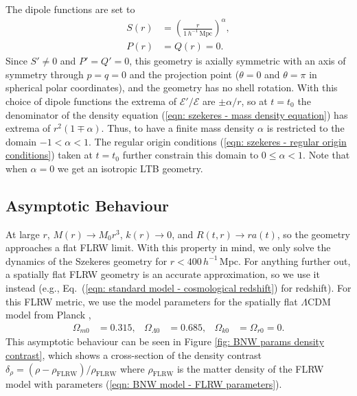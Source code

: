 \documentclass[a4paper,12pt]{report}
\renewcommand{\eqref}[1]{Eq.~({#1})}
\begin{document}
The dipole functions are set to
\begin{align}
  S(r) &= \left(\frac{r}{1\, h^{-1}\, \text{Mpc}}\right)^\alpha, \\
  P(r) &= Q(r) = 0.
\end{align}
Since $S' \neq 0$ and $P'=Q'=0$, this geometry is axially symmetric with an axis of symmetry through $p=q=0$ and the projection point ($\theta=0$ and $\theta=\pi$ in spherical polar coordinates), and the geometry has no shell rotation. With this choice of dipole functions the extrema of $\mathcal{E}'/\mathcal{E}$ are $\pm\alpha/r$, so at $t=t_0$ the denominator of the density equation (\ref{eqn: szekeres - mass density equation}) has extrema of $r^2(1 \mp \alpha)$.
Thus, to have a finite mass density $\alpha$ is restricted to the domain $-1 < \alpha < 1$. The regular origin conditions (\ref{eqn: szekeres - regular origin conditions}) taken at $t=t_0$ further constrain this domain to $0 \leq \alpha < 1$. Note that when $\alpha = 0$ we get an isotropic LTB geometry.

\subsection{Asymptotic Behaviour}
At large $r$, $M(r) \to M_0 r^3$, $k(r) \to 0$, and $R(t,r) \to ra(t)$, so the geometry approaches a flat FLRW limit. With this property in mind, we only solve the dynamics of the Szekeres geometry for $r<400\, h^{-1}\,$Mpc.
For anything further out, a spatially flat FLRW geometry is an accurate approximation, so we use it instead (e.g., \eqref{\ref{eqn: standard model - cosmological redshift}} for redshift). For this FLRW metric, we use the model parameters for the spatially flat $\Lambda$CDM model from Planck \cite{RN32},
\begin{align} \label{eqn: BNW model - FLRW parameters}
  \Omega_{m0} &= 0.315, & \Omega_{\Lambda0} &= 0.685, & \Omega_{k0} &= \Omega_{r0} = 0.
\end{align}
This asymptotic behaviour can be seen in Figure \ref{fig: BNW params density contrast}, which shows a cross-section of the density contrast $\delta_\rho = (\rho-\rho_\text{FLRW})/\rho_\text{FLRW}$ where $\rho_\text{FLRW}$ is the matter density of the FLRW model with parameters (\ref{eqn: BNW model - FLRW parameters}).
\end{document}
